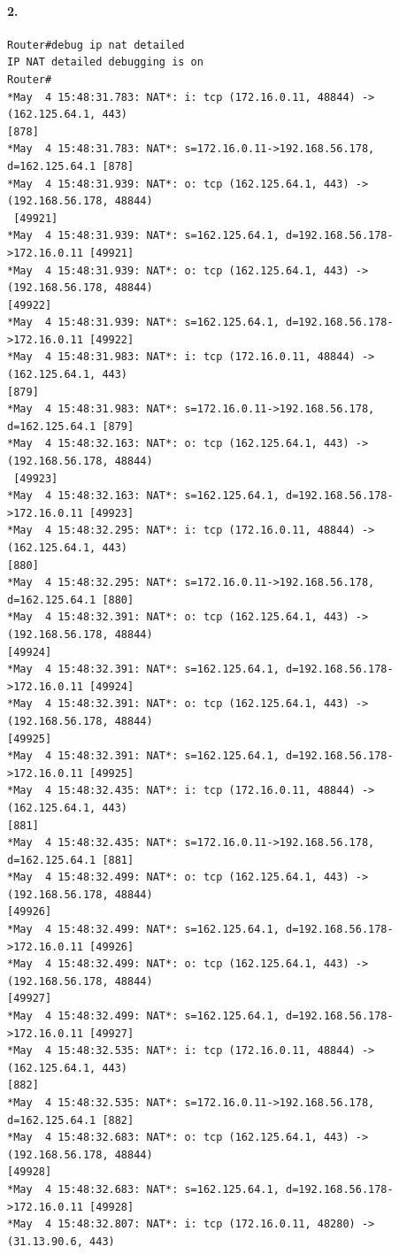 \paragraph{2.}

\begin{verbatim}
Router#debug ip nat detailed
IP NAT detailed debugging is on
Router#
*May  4 15:48:31.783: NAT*: i: tcp (172.16.0.11, 48844) -> (162.125.64.1, 443) 
[878]
*May  4 15:48:31.783: NAT*: s=172.16.0.11->192.168.56.178, d=162.125.64.1 [878]
*May  4 15:48:31.939: NAT*: o: tcp (162.125.64.1, 443) -> (192.168.56.178, 48844)
 [49921]
*May  4 15:48:31.939: NAT*: s=162.125.64.1, d=192.168.56.178->172.16.0.11 [49921]
*May  4 15:48:31.939: NAT*: o: tcp (162.125.64.1, 443) -> (192.168.56.178, 48844)
[49922]
*May  4 15:48:31.939: NAT*: s=162.125.64.1, d=192.168.56.178->172.16.0.11 [49922]
*May  4 15:48:31.983: NAT*: i: tcp (172.16.0.11, 48844) -> (162.125.64.1, 443) 
[879]
*May  4 15:48:31.983: NAT*: s=172.16.0.11->192.168.56.178, d=162.125.64.1 [879]
*May  4 15:48:32.163: NAT*: o: tcp (162.125.64.1, 443) -> (192.168.56.178, 48844)
 [49923]
*May  4 15:48:32.163: NAT*: s=162.125.64.1, d=192.168.56.178->172.16.0.11 [49923]
*May  4 15:48:32.295: NAT*: i: tcp (172.16.0.11, 48844) -> (162.125.64.1, 443) 
[880]
*May  4 15:48:32.295: NAT*: s=172.16.0.11->192.168.56.178, d=162.125.64.1 [880]
*May  4 15:48:32.391: NAT*: o: tcp (162.125.64.1, 443) -> (192.168.56.178, 48844) 
[49924]
*May  4 15:48:32.391: NAT*: s=162.125.64.1, d=192.168.56.178->172.16.0.11 [49924]
*May  4 15:48:32.391: NAT*: o: tcp (162.125.64.1, 443) -> (192.168.56.178, 48844) 
[49925]
*May  4 15:48:32.391: NAT*: s=162.125.64.1, d=192.168.56.178->172.16.0.11 [49925]
*May  4 15:48:32.435: NAT*: i: tcp (172.16.0.11, 48844) -> (162.125.64.1, 443) 
[881]
*May  4 15:48:32.435: NAT*: s=172.16.0.11->192.168.56.178, d=162.125.64.1 [881]
*May  4 15:48:32.499: NAT*: o: tcp (162.125.64.1, 443) -> (192.168.56.178, 48844) 
[49926]
*May  4 15:48:32.499: NAT*: s=162.125.64.1, d=192.168.56.178->172.16.0.11 [49926]
*May  4 15:48:32.499: NAT*: o: tcp (162.125.64.1, 443) -> (192.168.56.178, 48844) 
[49927]
*May  4 15:48:32.499: NAT*: s=162.125.64.1, d=192.168.56.178->172.16.0.11 [49927]
*May  4 15:48:32.535: NAT*: i: tcp (172.16.0.11, 48844) -> (162.125.64.1, 443) 
[882]
*May  4 15:48:32.535: NAT*: s=172.16.0.11->192.168.56.178, d=162.125.64.1 [882]
*May  4 15:48:32.683: NAT*: o: tcp (162.125.64.1, 443) -> (192.168.56.178, 48844) 
[49928]
*May  4 15:48:32.683: NAT*: s=162.125.64.1, d=192.168.56.178->172.16.0.11 [49928]
*May  4 15:48:32.807: NAT*: i: tcp (172.16.0.11, 48280) -> (31.13.90.6, 443) 

\end{verbatim}
